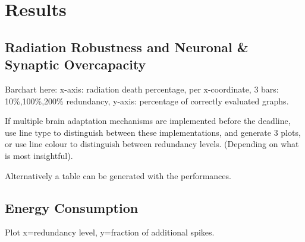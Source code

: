 \section{Results}\label{sec:results}

\subsection{Radiation Robustness and Neuronal \& Synaptic Overcapacity}\label{subsec:algorithm_performance}
Barchart here: x-axis: radiation death percentage, per x-coordinate, 3 bars: 10\%,100\%,200\% redundancy, y-axis: percentage of correctly evaluated graphs.

If  multiple brain adaptation mechanisms are implemented before the deadline, use line type to distinguish between these implementations, and generate 3 plots, or use line colour to distinguish between redundancy levels. (Depending on what is most insightful).

Alternatively a table can be generated with the performances.


\subsection{Energy Consumption}\label{subsec:results_energy_consumption}
Plot x=redundancy level, y=fraction of additional spikes.

